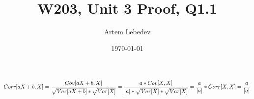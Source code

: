 \documentclass{article}
\author{Artem Lebedev}
\title{W203, Unit 3 Proof, Q1.1}
\date{\today}
\begin{document}
\maketitle

$$
Corr[aX+b,X]= \frac{Cov[aX+b,X]}{\sqrt{Var[aX+b]}*\sqrt{Var[X]}} = \frac{a*Cov[X,X]}{{|a|}*\sqrt{Var[X]}*\sqrt{Var[X]}}\\
= \frac{a}{|a|}*Corr[X,X] = \frac{a}{|a|}
$$
\end{document}
